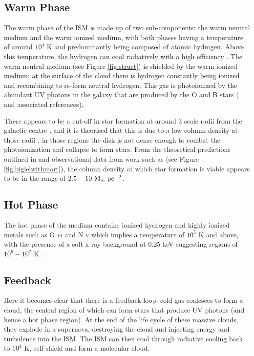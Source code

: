 \subsection{Warm Phase}

The warm phase of the ISM is made up of two sub-components: the warm neutral medium and the warm ionized medium, with both phases having a temperature of around $10^4$ K and predominantly being composed of atomic hydrogen.
Above this temperature, the hydrogen can cool radiatively with a high efficiency \citep{gnat_time-dependent_2007}.
The warm neutral medium (see Figure \ref{fig:struct}) is shielded by the warm ionized medium; at the surface of the cloud there is hydrogen constantly being ionized and recombining to re-form neutral hydrogen.
This gas is photoionized by the abundant UV photons in the galaxy that are produced by the O and B stars (\citet{lefloch_photoionization_2002} and associated references).

There appears to be a cut-off in star formation at around 3 scale radii from the galactic centre \citep{kennicutt_star_1989, martin_star_2001}, and it is theorised that this is due to a low column density at those radii \citep{schaye_star_2004}; in those regions the disk is not dense enough to combat the photoionization and collapse to form stars.
From the theoretical predictions outlined in \citep{schaye_star_2004} and observational data from work such as \citet{bigiel_star_2008} (see Figure \ref{fig:bigielwithmart}), the column density at which star formation is viable appears to be in the range of $2.5 - 10 ~\mathrm{M}_{\odot} ~\mathrm{pc}^{-2}$.

\subsection{Hot Phase}

The hot phase of the medium contains ionized hydrogen and highly ionized metals such as O \textsc{vi} and N \textsc{v} which implies a temperature of $10^{5}$ K and above, with the presence of a soft x-ray background at 0.25 keV suggesting regions of $10^6 - 10^7$ K \citep{ferriere_interstellar_2001}.

\subsection{Feedback}

Here it becomes clear that there is a feedback loop; cold gas coalesces to form a cloud, the central region of which can form stars that produce UV photons (and hence a hot phase region).
At the end of the life cycle of these massive clouds, they explode in a supernova, destroying the cloud and injecting energy and turbulence into the ISM.
The ISM can then cool through radiative cooling back to $10^4$ K, self-shield and form a molecular cloud.

